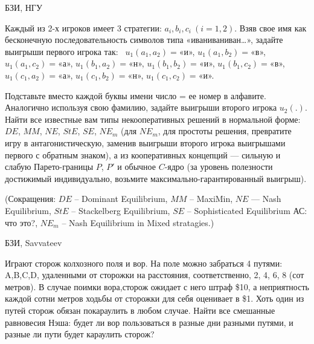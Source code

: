 \begin{problem}
\begin{source}
БЗИ, НГУ
\end{source} {\rm Каждый из
2-х игроков имеет 3 стратегии: $a_i, b_i, c_i~ (i=1,2)$.
Взяв свое имя как бесконечную последовательность символов
типа «иваниваниван\ldots », задайте выигрыши первого игрока
так:~ $u_1(a_1,a_{2}) = $«и», $ u_1(a_1,b_{2}) = $«в», $
u_1(a_1,c_{2}) = $«а», $ u_1(b_1,a_{2}) = $«н», $
u_1(b_1,b_{2}) = $«и», $ u_1(b_1,c_{2}) = $«в», $
u_1(c_1,a_{2}) = $«а», $ u_1(c_1,b_{2}) = $«н», $
u_1(c_1,c_{2}) = $«и».

Подставьте вместо каждой буквы имени число = ее номер в
алфавите. Аналогично используя свою фамилию, задайте
выигрыши второго игрока $u_2(.)$. Найти все известные вам
типы некооперативных решений в нормальной форме: $DE$,
$MM$, $NE$, $StE$, $SE$, $NE_m$ (для $NE_m$, для простоты
решения, превратите игру в антагонистическую, заменив
выигрыши второго игрока выигрышами первого с обратным
знаком), а из кооперативных концепций — сильную и слабую
Парето-границы $P$, $P'$ и обычное $C$-ядро (за уровень
полезности достижимый индивидуально,
возьмите максимально-гарантированный выигрыш).

(Сокращения: $DE$ -- Dominant Equilibrium, $MM$ -- MaxiMin,
$NE$ — Nash Equilibrium, $StE$ -- Stackelberg Equilibrium,
$SE$ -- Sophisticated Equilibrium {\red АС: что это?}, $NE_m$ -- Nash
Equilibrium in Mixed stratagies.) }



\begin{sol}

\end{sol}
\end{problem}







\begin{problem}
\begin{source}
БЗИ, Savvateev
\end{source}
Играют сторож колхозного поля и вор. На
поле можно забраться 4 путями: A,B,C,D, удаленными
от сторожки на расстояния, соответственно, 2, 4, 6,
8 (сот метров). В случае поимки вора,сторож
ожидает с него штраф \$10, а неприятность каждой
сотни метров ходьбы от сторожки для себя оценивает
в \$1. Хоть один из путей сторож обязан покараулить
в любом случае. Найти все смешанные равновесия
Нэша: будет ли  вор пользоваться в разные дни
разными путями, и разные ли пути будет караулить
сторож?






\begin{sol}

\end{sol}
\end{problem}





